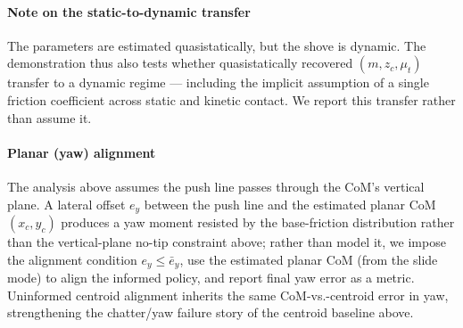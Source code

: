 \documentclass[10pt, conference]{IEEEtran}
\begin{document}
\paragraph{Note on the static-to-dynamic transfer}
The parameters are estimated quasistatically, but the shove is dynamic. The demonstration thus also tests whether quasistatically recovered $(m, z_c, \mu_t)$ transfer to a dynamic regime --- including the implicit assumption of a single friction coefficient across static and kinetic contact. We report this transfer rather than assume it.

\paragraph{Planar (yaw) alignment}
The analysis above assumes the push line passes through the CoM's vertical plane. A lateral offset $e_y$ between the push line and the estimated planar CoM $(x_c,y_c)$ produces a yaw moment resisted by the base-friction distribution rather than the vertical-plane no-tip constraint above; rather than model it, we impose the alignment condition $e_y \le \bar e_y$, use the estimated planar CoM (from the slide mode) to align the informed policy, and report final yaw error as a metric. Uninformed centroid alignment inherits the same CoM-vs.-centroid error in yaw, strengthening the chatter/yaw failure story of the centroid baseline above.
\end{document}
